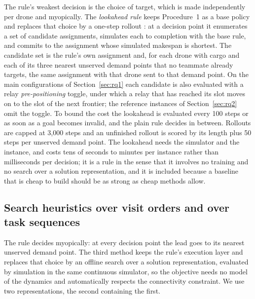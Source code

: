 \documentclass[final,5p,times,twocolumn]{elsarticle}
\begin{document}
The rule's weakest decision is the choice of target, which is made independently per drone and
myopically. The \emph{lookahead rule} keeps Procedure~1 as a base policy and replaces that choice by a
one-step rollout \cite{bertsekas1997rollout}: at a decision point it enumerates a set of candidate
assignments, simulates each to completion with the base rule, and commits to the assignment whose
simulated makespan is shortest. The candidate set is the rule's own assignment and, for each drone
with cargo and each of its three nearest unserved demand points that no teammate already targets,
the same assignment with that drone sent to that demand point. On the main configurations of
Section~\ref{sec:rq1} each candidate is also evaluated with a relay \emph{pre-positioning} toggle,
under which a relay that has reached its slot moves on to the slot of the next frontier; the
reference instances of Section~\ref{sec:rq2} omit the toggle. To bound the cost the lookahead is
evaluated every 100 steps or as soon as a goal becomes invalid, and the plain rule decides in
between. Rollouts are capped at 3{,}000 steps and an unfinished rollout is scored by its length plus
50 steps per unserved demand point. The lookahead needs the simulator and the instance, and costs
tens of seconds to minutes per instance rather than milliseconds per decision; it is a rule in the
sense that it involves no training and no search over a solution representation, and it is
included because a baseline that is cheap to build should be as strong as cheap methods allow.

\subsection{Search heuristics over visit orders and over task sequences}
\label{sec:search}

The rule decides myopically: at every decision point the lead goes to its nearest unserved demand
point. The third method keeps the rule's execution layer and replaces that choice by an offline
search over a solution representation, evaluated by simulation in the same continuous simulator,
so the objective needs no model of the dynamics and automatically respects the connectivity
constraint. We use two representations, the second containing the first.
\end{document}
